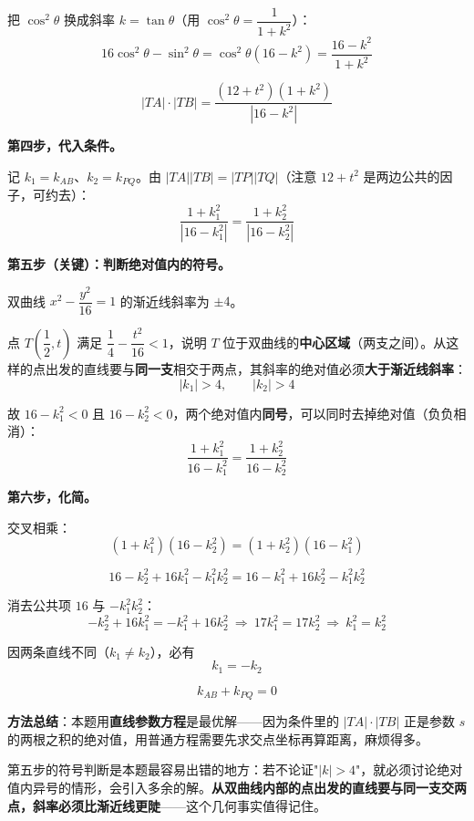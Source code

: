 把 $\cos^2\theta$ 换成斜率 $k=\tan\theta$（用 $\cos^{2}\theta=\dfrac1{1+k^{2}}$）：
\[16\cos^{2}\theta-\sin^{2}\theta=\cos^{2}\theta\left(16-k^{2}\right)=\frac{16-k^{2}}{1+k^{2}}\]

\[|TA|\cdot|TB|=\frac{\left(12+t^{2}\right)\left(1+k^{2}\right)}{\left|16-k^{2}\right|}\]

\textbf{第四步，代入条件。}

记 $k_1=k_{AB}$、$k_2=k_{PQ}$。由 $|TA||TB|=|TP||TQ|$（注意 $12+t^{2}$ 是两边公共的因子，可约去）：
\[\frac{1+k_1^{2}}{\left|16-k_1^{2}\right|}=\frac{1+k_2^{2}}{\left|16-k_2^{2}\right|}\]

\textbf{第五步（关键）：判断绝对值内的符号。}

双曲线 $x^{2}-\dfrac{y^{2}}{16}=1$ 的渐近线斜率为 $\pm4$。

点 $T\left(\dfrac12,t\right)$ 满足 $\dfrac14-\dfrac{t^{2}}{16}<1$，说明 $T$ 位于双曲线的\textbf{中心区域}（两支之间）。从这样的点出发的直线要与\textbf{同一支}相交于两点，其斜率的绝对值必须\textbf{大于渐近线斜率}：
\[\left|k_1\right|>4,\qquad \left|k_2\right|>4\]

故 $16-k_1^{2}<0$ 且 $16-k_2^{2}<0$，两个绝对值内\textbf{同号}，可以同时去掉绝对值（负负相消）：
\[\frac{1+k_1^{2}}{16-k_1^{2}}=\frac{1+k_2^{2}}{16-k_2^{2}}\]

\textbf{第六步，化简。}

交叉相乘：
\[\left(1+k_1^{2}\right)\left(16-k_2^{2}\right)=\left(1+k_2^{2}\right)\left(16-k_1^{2}\right)\]

\[16-k_2^{2}+16k_1^{2}-k_1^{2}k_2^{2}=16-k_1^{2}+16k_2^{2}-k_1^{2}k_2^{2}\]

消去公共项 $16$ 与 $-k_1^{2}k_2^{2}$：
\[-k_2^{2}+16k_1^{2}=-k_1^{2}+16k_2^{2}\ \Longrightarrow\ 17k_1^{2}=17k_2^{2}\ \Longrightarrow\ k_1^{2}=k_2^{2}\]

因两条直线不同（$k_1\ne k_2$），必有
\[k_1=-k_2\]

\[k_{AB}+k_{PQ}=0\]


\begin{gktip}
\textbf{方法总结}：本题用\textbf{直线参数方程}是最优解——因为条件里的 $|TA|\cdot|TB|$ 正是参数 $s$ 的两根之积的绝对值，用普通方程需要先求交点坐标再算距离，麻烦得多。

第五步的符号判断是本题最容易出错的地方：若不论证"$|k|>4$"，就必须讨论绝对值内异号的情形，会引入多余的解。\textbf{从双曲线内部的点出发的直线要与同一支交两点，斜率必须比渐近线更陡}——这个几何事实值得记住。
\end{gktip}

